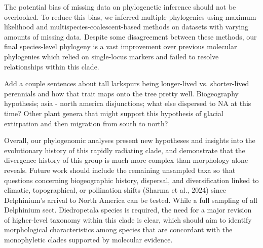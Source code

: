 \documentclass[11pt]{article}
\begin{document}
The potential bias of missing data on phylogenetic inference should not be overlooked. To reduce this bias, we inferred multiple phylogenies using maximum-likelihood and multispecies-coalescent-based methods on datasets with varying amounts of missing data. Despite some disagreement between these methods, our final species-level phylogeny is a vast improvement over previous molecular phylogenies which relied on single-locus markers and failed to resolve relationships within this clade.

Add a couple sentences about tall larkspurs being longer-lived vs. shorter-lived perennials and how that trait maps onto the tree pretty well.
Biogeography hypothesis; asia - north america disjunctions; what else dispersed to NA at this time? Other plant genera that might support this hypothesis of glacial extirpation and then migration from south to north?

Overall, our phylogenomic analyses present new hypotheses and insights into the evolutionary history of this rapidly radiating clade, and demonstrate that the divergence history of this group is much more complex than morphology alone reveals. Future work should include the remaining unsampled taxa so that questions concerning biogeographic history, dispersal, and diversification linked to climatic, topographical, or pollination shifts (Sharma et al., 2024) since Delphinium’s arrival to North America can be tested. While a full sampling of all Delphinium sect. Diedropetala species is required, the need for a major revision of higher-level taxonomy within this clade is clear, which should aim to identify morphological characteristics among species that are concordant with the monophyletic clades supported by molecular evidence.



  
\end{document}
